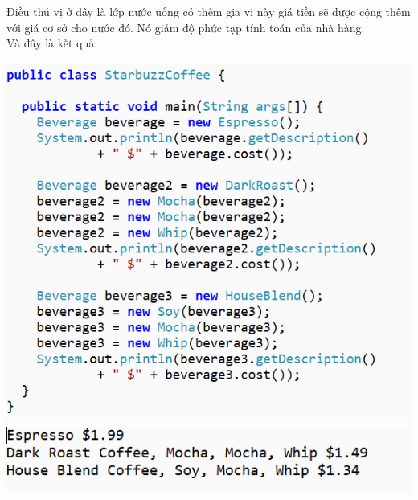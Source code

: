 Điều thú vị ở đây là lớp nước uống có thêm gia vị này giá tiền sẽ được cộng thêm với giá cơ sở cho nước đó. Nó giảm độ phức tạp tính toán của nhà hàng.\\
Và đây là kết quả:
\begin{center}
	\includegraphics{GALLEYS/images/chapter4/images8}
	\includegraphics{GALLEYS/images/chapter4/images9}
\end{center}
